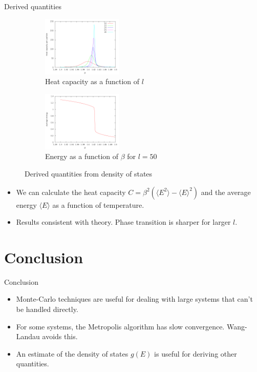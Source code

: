 \documentclass{beamer}
\begin{document}
\begin{frame}{Derived quantities}
    \begin{figure}[H]
        \begin{subfigure}[t]{1.5in}\includegraphics[width=1.5in]{../results/wanglandau/capacity.png}\caption{Heat capacity as a function of $l$}\end{subfigure}
        \begin{subfigure}[t]{1.5in}\includegraphics[width=1.5in]{../results/wanglandau/e50.png}\caption{Energy as a function of $\beta$ for $l = 50$}\end{subfigure}
        \caption{Derived quantities from density of states}
    \end{figure}
    \begin{itemize}
        \item We can calculate the heat capacity $C = \beta^2\left(\langle E^2\rangle - \langle E\rangle^2\right)$ and the average energy $\langle E\rangle$ as a function of temperature.
        \item Results consistent with theory. Phase transition is sharper for larger $l$.
    \end{itemize}
\end{frame}
\section{Conclusion}
\begin{frame}{Conclusion}
    \begin{itemize}
        \item Monte-Carlo techniques are useful for dealing with large systems that can't be handled directly.
        \item For some systems, the Metropolis algorithm has slow convergence. Wang-Landau avoids this.
        \item An estimate of the density of states $g(E)$ is useful for deriving other quantities.
    \end{itemize}
\end{frame}
\end{document}

